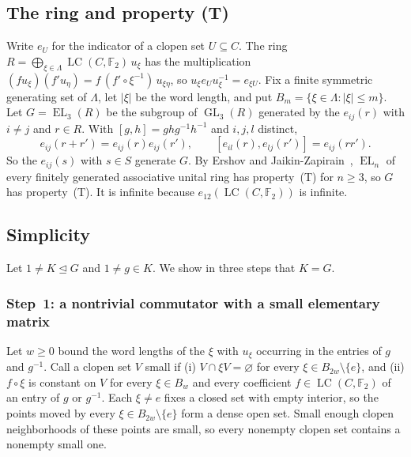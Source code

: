 \documentclass[11pt]{amsart}
\newcommand{\F}{\mathbb F}
\newcommand{\LC}{\operatorname{LC}}
\newcommand{\EL}{\operatorname{EL}}
\newcommand{\GL}{\operatorname{GL}}
\begin{document}
\subsection*{The ring and property (T)}
Write $e_U$ for the indicator of a clopen set $U\subseteq C$. The ring
$R=\bigoplus_{\xi\in\Lambda}\LC(C,\F_2)\,u_\xi$ has the multiplication
$(fu_\xi)(f'u_\eta)=f\,(f'\circ\xi^{-1})\,u_{\xi\eta}$, so
$u_\xi e_Uu_\xi^{-1}=e_{\xi U}$. Fix a finite symmetric generating set of
$\Lambda$, let $|\xi|$ be the word length, and put
$B_m=\{\xi\in\Lambda:|\xi|\le m\}$. Let $G=\EL_3(R)$ be the subgroup of
$\GL_3(R)$ generated by the $e_{ij}(r)$ with $i\ne j$ and $r\in R$. With
$[g,h]=ghg^{-1}h^{-1}$ and $i,j,l$ distinct,
\begin{equation}\label{eq:elementary}
 e_{ij}(r+r')=e_{ij}(r)e_{ij}(r'),\qquad [e_{il}(r),e_{lj}(r')]=e_{ij}(rr').
\end{equation}
So the $e_{ij}(s)$ with $s\in S$ generate $G$. By Ershov and
Jaikin-Zapirain~\cite[Theorem~1.1]{EJZ}, $\EL_n$ of every finitely
generated associative unital ring has property~\textup{(T)} for $n\ge3$,
so $G$ has property~\textup{(T)}. It is infinite because
$e_{12}(\LC(C,\F_2))$ is infinite.

\subsection*{Simplicity}
Let $1\ne K\trianglelefteq G$ and $1\ne g\in K$. We show in three steps
that $K=G$.

\subsubsection*{Step~1: a nontrivial commutator with a small elementary matrix}
Let $w\ge0$ bound the word lengths of the $\xi$ with $u_\xi$ occurring in
the entries of $g$ and $g^{-1}$. Call a clopen set $V$ small if (i)
$V\cap\xi V=\varnothing$ for every $\xi\in B_{2w}\setminus\{e\}$, and (ii)
$f\circ\xi$ is constant on $V$ for every $\xi\in B_w$ and every
coefficient $f\in\LC(C,\F_2)$ of an entry of $g$ or $g^{-1}$. Each
$\xi\ne e$ fixes a closed set with empty interior, so the points moved by
every $\xi\in B_{2w}\setminus\{e\}$ form a dense open set. Small enough
clopen neighborhoods of these points are small, so every nonempty clopen
set contains a nonempty small one.
\end{document}
